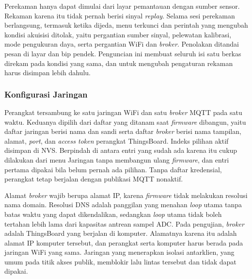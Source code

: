 Perekaman hanya dapat dimulai dari layar pemantauan dengan sumber sensor. Rekaman karena itu tidak pernah berisi sinyal \textit{replay}. Selama sesi perekaman berlangsung, termasuk ketika dijeda, menu terkunci dan perintah yang mengubah kondisi akuisisi ditolak, yaitu pergantian sumber sinyal, pelewatan kalibrasi, mode pengukuran daya, serta pergantian WiFi dan \textit{broker}. Penolakan ditandai pesan di layar dan bip pendek. Penguncian ini membuat seluruh isi satu berkas direkam pada kondisi yang sama, dan untuk mengubah pengaturan rekaman harus disimpan lebih dahulu.

\subsubsection{Konfigurasi Jaringan}

Perangkat tersambung ke satu jaringan WiFi dan satu \textit{broker} MQTT pada satu waktu. Keduanya dipilih dari daftar yang ditanam saat \textit{firmware} dibangun, yaitu daftar jaringan berisi nama dan sandi serta daftar \textit{broker} berisi nama tampilan, alamat, \textit{port}, dan \textit{access token} perangkat ThingsBoard. Indeks pilihan aktif disimpan di NVS. Berpindah di antara entri yang sudah ada karena itu cukup dilakukan dari menu Jaringan tanpa membangun ulang \textit{firmware}, dan entri pertama dipakai bila belum pernah ada pilihan. Tanpa daftar kredensial, perangkat tetap berjalan dengan publikasi MQTT nonaktif.

Alamat \textit{broker} wajib berupa alamat IP, karena \textit{firmware} tidak melakukan resolusi nama domain. Resolusi DNS adalah panggilan yang menahan \textit{loop} utama tanpa batas waktu yang dapat dikendalikan, sedangkan \textit{loop} utama tidak boleh tertahan lebih lama dari kapasitas antrean sampel ADC. Pada pengujian, \textit{broker} adalah ThingsBoard yang berjalan di komputer. Alamatnya karena itu adalah alamat IP komputer tersebut, dan perangkat serta komputer harus berada pada jaringan WiFi yang sama. Jaringan yang menerapkan isolasi antarklien, yang umum pada titik akses publik, memblokir lalu lintas tersebut dan tidak dapat dipakai.


